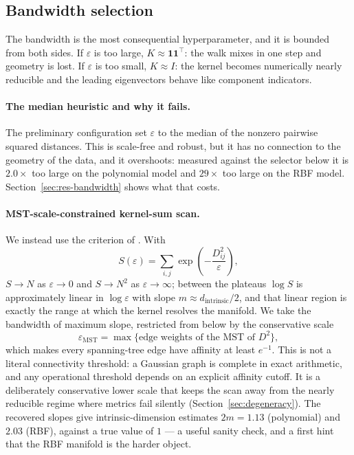 \documentclass[11pt]{article}
\newcommand{\eps}{\varepsilon}
\begin{document}
\subsection{Bandwidth selection}
\label{sec:bandwidth}

The bandwidth is the most consequential hyperparameter, and it is bounded from
both sides. If $\eps$ is too large, $K \approx \mathbf{1}\mathbf{1}^\top$: the
walk mixes in one step and geometry is lost. If $\eps$ is too small,
$K\approx I$: the kernel becomes numerically nearly reducible and the leading
eigenvectors behave like component indicators.

\paragraph{The median heuristic and why it fails.}
The preliminary configuration set $\eps$ to the median of the nonzero pairwise
squared distances. This is scale-free and robust, but it has no connection to the
geometry of the data, and it overshoots: measured against the selector below it
is $2.0\times$ too large on the polynomial model and $29\times$ too large on the
RBF model. Section~\ref{sec:res-bandwidth} shows what that costs.

\paragraph{MST-scale-constrained kernel-sum scan.}
We instead use the criterion of \citet{coifman2006diffusion}. With
\begin{equation}
S(\eps) = \sum_{i,j}\exp\!\left(-\frac{D^2_{ij}}{\eps}\right) ,
\end{equation}
$S\to N$ as $\eps\to0$ and $S\to N^2$ as $\eps\to\infty$; between the plateaus
$\log S$ is approximately linear in $\log\eps$ with slope $m\approx
d_{\mathrm{intrinsic}}/2$, and that linear region is exactly the range at which
the kernel resolves the manifold. We take the bandwidth of maximum slope,
restricted from below by the conservative scale
\begin{equation}
\eps_{\mathrm{MST}} = \max\{\text{edge weights of the MST of } D^2\} ,
\label{eq:floor}
\end{equation}
which makes every spanning-tree edge have affinity at least $e^{-1}$. This is not
a literal connectivity threshold: a Gaussian graph is complete in exact
arithmetic, and any operational threshold depends on an explicit affinity
cutoff. It is a deliberately conservative lower scale that keeps the scan away
from the nearly reducible regime where metrics fail silently
(Section~\ref{sec:degeneracy}). The recovered slopes give
intrinsic-dimension estimates $2m = 1.13$ (polynomial) and $2.03$ (RBF), against
a true value of $1$ --- a useful sanity check, and a first hint that the RBF
manifold is the harder object.
\end{document}
